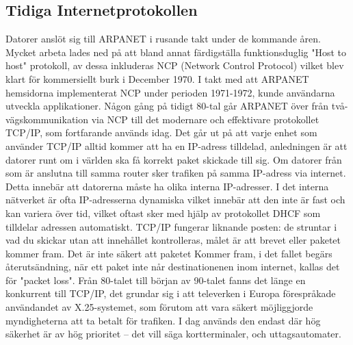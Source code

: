 \documentclass[a4paper,11pt]{article}
\begin{document}
\subsection{Tidiga Internetprotokollen}
Datorer anslöt sig till ARPANET i rusande takt under de kommande åren.
Mycket arbeta lades ned på att bland annat färdigställa funktionsduglig "Host to
host" protokoll, av dessa inkluderas NCP (Network Control Protocol) vilket blev
klart för kommersiellt burk i December 1970. I takt med att ARPANET hemsidorna
implementerat NCP under perioden 1971-1972, kunde användarna utveckla applikationer.
Någon gång på tidigt 80-tal går ARPANET över från två-vägs\-kommunikation via NCP till
det modernare och effektivare protokollet TCP/IP, som fortfarande används idag. Det
går ut på att varje enhet som använder TCP/IP alltid kommer att ha en IP-adress
tilldelad, anledningen är att datorer runt om i världen ska få korrekt paket
skickade till sig. Om datorer från som är anslutna till samma router sker trafiken
på samma IP-adress via internet. Detta innebär att datorerna måste ha olika interna
IP-adresser. I det interna nätverket är ofta IP-adresserna dynamiska vilket innebär
att den inte är fast och kan variera över tid, vilket oftast sker med hjälp av
protokollet DHCF som tilldelar adressen automatiskt. TCP/IP fungerar liknande
posten: de struntar i vad du skickar utan att innehållet kontrolleras, målet är att
brevet eller paketet kommer fram. Det är inte säkert att paketet Kommer fram, i det
fallet begärs återutsändning, när ett paket inte når destinationenen inom internet,
kallas det för "packet loss". \cite{Wikipedia} Från 80-talet  till början av 90-talet fanns det länge
en konkurrent till TCP/IP, det grundar sig i att televerken i Europa förespråkade
användandet av X.25-systemet, som förutom att vara säkert möjliggjorde myndigheterna
att ta betalt för trafiken. I dag används den endast där hög säkerhet är av hög
prioritet -- det vill säga kortterminaler, och uttagsautomater.

\printbibliography
\end{document}
